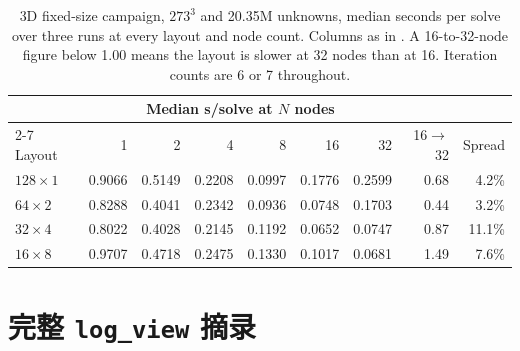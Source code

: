 \documentclass[11pt,a4paper,oneside]{report}
\begin{document}
\begin{table}[htbp]
  \centering
  \caption{3D fixed-size campaign, $273^3$ and 20.35M unknowns, median seconds per solve
  over three runs at every layout and node count. Columns as in
  . A 16-to-32-node figure below 1.00 means the layout is
  slower at 32 nodes than at 16. Iteration counts are 6 or 7 throughout.}
  \label{tab:strong20m-grid-3d}
  \begin{tabular}{lrrrrrrrr}
    \toprule
    & \multicolumn{6}{c}{Median s/solve at $N$ nodes} & & \\
    \cmidrule(lr){2-7}
    Layout & 1 & 2 & 4 & 8 & 16 & 32 & 16$\to$32 & Spread \\
    \midrule
    $128\times1$ & 0.9066 & 0.5149 & 0.2208 & 0.0997 & 0.1776 & 0.2599 & 0.68 & 4.2\% \\
    $64\times2$ & 0.8288 & 0.4041 & 0.2342 & 0.0936 & 0.0748 & 0.1703 & 0.44 & 3.2\% \\
    $32\times4$ & 0.8022 & 0.4028 & 0.2145 & 0.1192 & 0.0652 & 0.0747 & 0.87 & 11.1\% \\
    $16\times8$ & 0.9707 & 0.4718 & 0.2475 & 0.1330 & 0.1017 & 0.0681 & 1.49 & 7.6\% \\
    \bottomrule
  \end{tabular}
\end{table}

\chapter{完整 \texttt{log\_view} 摘录}
\label{app:logs}
\end{document}
